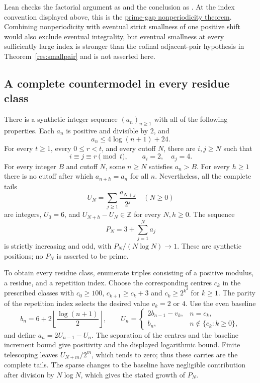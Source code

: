 \documentclass[11pt]{article}
\begin{document}
\noindent Lean checks the factorial argument as
 and the conclusion as
.  At the index convention displayed above, this is the
\href{https://github.com/wcook04/plectis-erdos/blob/f36a98bf3d3e6f65f1074e3b800e3293d5b8a51a/ErdosProblems/Erdos251/PaperCoreR7.lean#L175}{prime-gap nonperiodicity theorem}.  Combining nonperiodicity with eventual strict smallness of one
positive shift would also exclude eventual integrality, but eventual
smallness at every sufficiently large index is stronger than the cofinal
adjacent-pair hypothesis in Theorem~\ref{res:smallpair} and is not asserted
here.


\subsection{A complete countermodel in every residue class}
\label{res:all-residue-log-countermodel}
There is a synthetic integer sequence $(a_n)_{n\ge1}$ with all of the
following properties.  Each $a_n$ is positive and divisible by $2$, and
\[
 a_n\le 4\log(n+1)+24.
\]
For every $t\ge1$, every $0\le r<t$, and every cutoff $N$, there are
$i,j\ge N$ such that
\[
 i\equiv j\equiv r\pmod t,\qquad a_i=2,\quad a_j=4.
\]
For every integer $B$ and cutoff $N$, some $n\ge N$ satisfies $a_n>B$.
For every $h\ge1$ there is no cutoff after which $a_{n+h}=a_n$ for all $n$.
Nevertheless, all the complete tails
\[
 U_N=\sum_{j\ge1}\frac{a_{N+j}}{2^j}\quad(N\ge0)
\]
are integers, $U_0=6$, and $U_{N+h}-U_N\in\mathbb Z$ for every $N,h\ge0$.
The sequence
\[
 P_N=3+\sum_{j=1}^{N}a_j
\]
is strictly increasing and odd, with $P_N/(N\log N)\to1$.
These are synthetic positions; no $P_N$ is asserted to be prime.

To obtain every residue class, enumerate triples consisting of a positive
modulus, a residue, and a repetition index.  Choose the corresponding
centres $c_k$ in the prescribed classes with $c_0\ge100$,
$c_{k+1}\ge c_k+3$ and $c_k\ge2^{k^2}$ for $k\ge1$.
The parity of the repetition index selects the desired value $v_k=2$ or $4$.
Use the even baseline
\[
 b_n=6+2\left\lfloor\frac{\log(n+1)}2\right\rfloor,
 \qquad
 U_n=\begin{cases}2b_{n-1}-v_k,&n=c_k,\\b_n,&n\notin\{c_k:k\ge0\},\end{cases}
\]
and define $a_n=2U_{n-1}-U_n$.  The separation of the centres and the
baseline increment bound give positivity and the displayed logarithmic
bound.  Finite telescoping leaves $U_{N+m}/2^m$, which tends to zero;
thus these carries are the complete tails.  The sparse changes to the
baseline have negligible contribution after division by $N\log N$,
which gives the stated growth of $P_N$.
\end{document}
